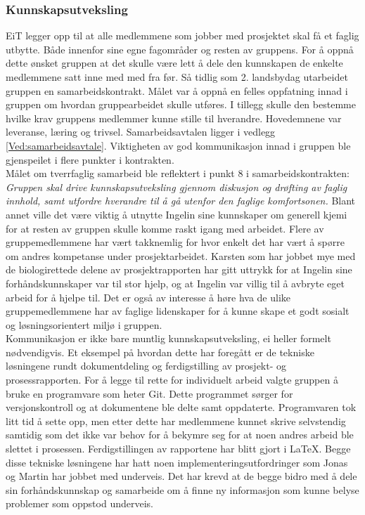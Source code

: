 \subsubsection{Kunnskapsutveksling}
EiT legger opp til at alle medlemmene som jobber med prosjektet skal få et faglig utbytte.
Både innenfor sine egne fagområder og resten av gruppens.
For å oppnå dette ønsket gruppen at det skulle være lett å dele den kunnskapen de enkelte medlemmene satt inne med med fra før.
Så tidlig som 2. landsbydag utarbeidet gruppen en samarbeidskontrakt.
Målet var å oppnå en felles oppfatning innad i gruppen om hvordan gruppearbeidet skulle utføres.
I tillegg skulle den bestemme hvilke krav gruppens medlemmer kunne stille til hverandre.
Hovedemnene var leveranse, læring og trivsel.
Samarbeidsavtalen ligger i vedlegg \ref{Ved:samarbeidsavtale}.
Viktigheten av god kommunikasjon innad i gruppen ble gjenspeilet i flere punkter i kontrakten. \\

Målet om tverrfaglig samarbeid ble reflektert i punkt 8 i samarbeidskontrakten: \textit{Gruppen skal drive kunnskapsutveksling gjennom diskusjon og drøfting av faglig innhold, samt utfordre hverandre til å gå utenfor den faglige komfortsonen.} Blant annet ville det være viktig å utnytte Ingelin sine kunnskaper om generell kjemi for at resten av gruppen skulle komme raskt igang med arbeidet.
Flere av gruppemedlemmene har vært takknemlig for hvor enkelt det har vært å spørre om andres kompetanse under prosjektarbeidet.
Karsten som har jobbet mye med de biologirettede delene av prosjektrapporten har gitt uttrykk for at Ingelin sine forhåndskunnskaper var til stor hjelp, og at Ingelin var villig til å avbryte eget arbeid for å hjelpe til.
Det er også av interesse å høre hva de ulike gruppemedlemmene har av faglige lidenskaper for å kunne skape et godt sosialt og løsningsorientert miljø i gruppen. \\

Kommunikasjon er ikke bare muntlig kunnskapsutveksling, ei heller formelt nødvendigvis.
Et eksempel på hvordan dette har foregått er de tekniske løsningene rundt dokumentdeling og ferdigstilling av prosjekt- og prosessrapporten.
For å legge til rette for individuelt arbeid valgte gruppen å bruke en programvare som heter Git.
Dette programmet sørger for versjonskontroll og at dokumentene ble delte samt oppdaterte.
Programvaren tok litt tid å sette opp, men etter dette har medlemmene kunnet skrive selvstendig samtidig som det ikke var behov for å bekymre seg for at noen andres arbeid ble slettet i prosessen.
Ferdigstillingen av rapportene har blitt gjort i \LaTeX.
Begge disse tekniske løsningene har hatt noen implementeringsutfordringer som Jonas og Martin har jobbet med underveis.
Det har krevd at de begge bidro med å dele sin forhåndskunnskap og samarbeide om å finne ny informasjon som kunne belyse problemer som oppstod underveis. \\
